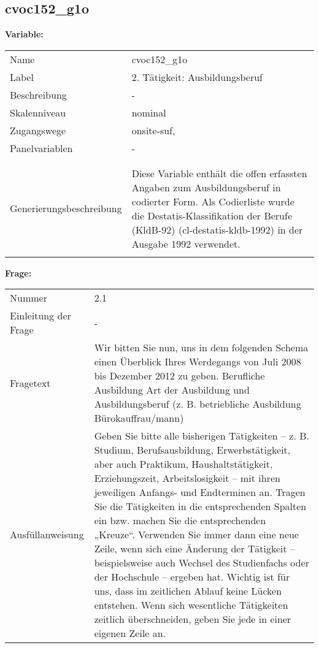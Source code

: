 	
	
	\subsection{cvoc152\_g1o}
	\label{subSection:cvoc152_g1o}

	\noindent\textbf{Variable:}\\
		\begin{tabular}{lL{11.3cm}}
			\label{tableVariable:cvoc152_g1o}
			Name & cvoc152\_g1o \\
			Label & 2. Tätigkeit: Ausbildungsberuf \\
			Beschreibung & - \\
			Skalenniveau & nominal \\
			Zugangswege &
				onsite-suf,
 \\
			Panelvariablen & -
			 \\
			 \\
 \\
					Generierungsbeschreibung & Diese Variable enthält die offen erfassten Angaben zum Ausbildungsberuf in codierter Form. Als Codierliste wurde die Destatis-Klassifikation der Berufe (KldB-92) (cl-destatis-kldb-1992) in der Ausgabe 1992 verwendet. 
				 \\	
			 \\
		\end{tabular}

		\vspace*{1 cm}
		\noindent\textbf{Frage:}\\
		\begin{tabular}{lL{11.3cm}}
			\label{tableQuestion:cvoc152_g1o}
			Nummer & 2.1 \\
			Einleitung der Frage & - \\
			Fragetext & Wir bitten Sie nun, uns in dem folgenden Schema einen Überblick Ihres Werdegangs von Juli 2008 bis Dezember 2012 zu geben.
Berufliche Ausbildung
Art der Ausbildung und Ausbildungsberuf
(z. B. betriebliche Ausbildung Bürokauffrau/mann) \\
			Ausfüllanweisung & Geben Sie bitte alle bisherigen Tätigkeiten – z. B. Studium, Berufsausbildung, Erwerbstätigkeit, aber auch Praktikum, Haushaltstätigkeit,
Erziehungszeit, Arbeitslosigkeit – mit ihren jeweiligen Anfangs- und Endterminen an. Tragen Sie die Tätigkeiten in die entsprechenden Spalten ein bzw. machen Sie die entsprechenden „Kreuze“. Verwenden Sie immer dann eine neue Zeile, wenn sich eine Änderung der Tätigkeit – beispielsweise auch Wechsel des Studienfachs oder der Hochschule – ergeben hat. Wichtig ist für uns, dass im zeitlichen Ablauf keine Lücken entstehen. Wenn sich wesentliche Tätigkeiten zeitlich überschneiden, geben Sie jede in einer eigenen Zeile an. \\
		\end{tabular}





